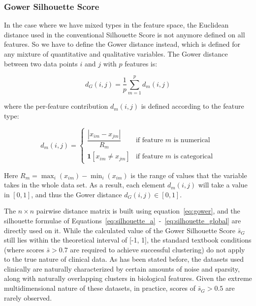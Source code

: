 \subsubsection*{Gower Silhouette Score}
\label{ch:gower}

In the case where we have mixed types in the feature space, the Euclidean distance used in the conventional Silhouette Score is not anymore defined on all features. So we have to define the Gower distance \cite{gower1971} instead, which is defined for any mixture of quantitative and qualitative variables. The Gower distance between two data points $i$ and $j$ with $p$ features is:

\begin{equation}
    d_G(i, j) = \frac{1}{p} \sum_{m=1}^{p} d_m(i, j)
    \label{eq:gower}
\end{equation}

where the per-feature contribution $d_m(i, j)$ is defined according to the feature type:

\begin{equation}
    d_m(i, j) =
    \begin{cases}
        \dfrac{|x_{im} - x_{jm}|}{R_m} & \text{if feature } m \text{ is numerical} \\[8pt]
        \mathbf{1}[x_{im} \neq x_{jm}]  & \text{if feature } m \text{ is categorical}
    \end{cases}
    \label{eq:gower_dm}
\end{equation}

Here $R_m=\max_i(x_{im})-\min_i(x_{im})$ is the range of values that the variable takes in the whole data set. As a result, each element $d_m(i,j)$ will take a value in $[0,1]$, and thus the Gower distance $d_G(i,j)\in[0,1]$.

The $n\times n$ pairwise distance matrix is built using equation~\eqref{eq:gower}, and the silhouette formulae of Equations~\eqref{eq:silhouette_a}~-~\eqref{eq:silhouette_global} are directly used on it. While the calculated value of the Gower Silhouette Score $\bar{s}_G$ still lies within the theoretical interval of [-1, 1], the standard textbook conditions (where scores $\bar{s} > 0.7$ are required to achieve successful clustering) do not apply to the true nature of clinical data. As has been stated before, the datasets used clinically are naturally characterized by certain amounts of noise and sparsity, along with naturally overlapping clusters in biological features. Given the extreme multidimensional nature of these datasets, in practice, scores of $\bar{s}_G > 0.5$ are rarely observed.

